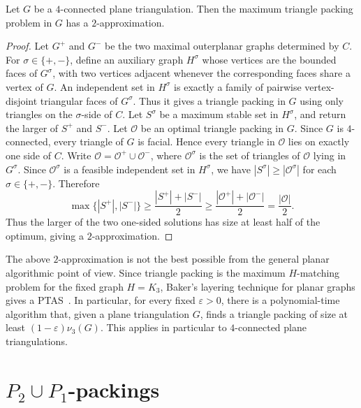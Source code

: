 \documentclass{patmorin}
\begin{document}
\begin{thm}\label{cor:4conn-two-approx}
Let $G$ be a $4$-connected plane triangulation. Then the maximum triangle packing problem in $G$ has a $2$-approximation.
\end{thm}

\begin{proof}
Let $G^+$ and $G^-$ be the two maximal outerplanar graphs determined by
$C$. For $\sigma\in\{+,-\}$, define an auxiliary graph $H^\sigma$ whose
vertices are the bounded faces of $G^\sigma$, with two vertices adjacent
whenever the corresponding faces share a vertex of $G$.
An independent set  in $H^\sigma$ is exactly a family of pairwise vertex-disjoint
triangular faces of $G^\sigma$. Thus it gives a triangle packing in $G$ using
only triangles on the $\sigma$-side of $C$. Let $S^\sigma$ be a maximum stable
set in $H^\sigma$, and return the larger of $S^+$ and $S^-$.
Let $\mathcal O$ be an optimal triangle packing in $G$. Since $G$ is
$4$-connected, every triangle of $G$ is facial. Hence every triangle in
$\mathcal O$ lies on exactly one side of $C$. 
Write $\mathcal O=\mathcal O^+\cup \mathcal O^-$,
where $\mathcal O^\sigma$ is the set of triangles of $\mathcal O$ lying in
$G^\sigma$. Since $\mathcal O^\sigma$ is a feasible independent set  in
$H^\sigma$, we have $|S^\sigma|\ge |\mathcal O^\sigma|$ for each $\sigma\in\{+,-\}$.
Therefore
\[
\max\{|S^+|,|S^-|\}
\ge
\frac{|S^+|+|S^-|}{2}
\ge
\frac{|\mathcal O^+|+|\mathcal O^-|}{2}
=
\frac{|\mathcal O|}{2}.
\]
Thus the larger of the two one-sided solutions has size at least half of the
optimum, giving a $2$-approximation.
\end{proof}

\begin{rmk}
The above $2$-approximation is not the best possible from the general planar
algorithmic point of view. Since triangle packing is the maximum
$H$-matching problem for the fixed graph $H=K_3$, Baker's layering technique
for planar graphs gives a PTAS~\cite{Baker1994}. In particular, for every
fixed $\varepsilon>0$, there is a polynomial-time algorithm that, given a
plane triangulation $G$, finds a triangle packing of size at least $(1-\varepsilon)\nu_3(G)$.
This applies in particular to $4$-connected plane triangulations.
\end{rmk}
\section{\texorpdfstring{$P_2\cup P_1$-packings}{p1p2-packing}}
\end{document}
